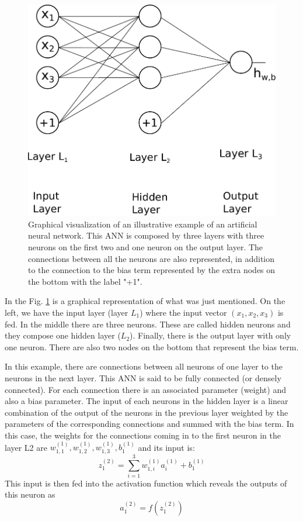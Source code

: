 \documentclass{article}
\begin{document}
\begin{figure}[!h]
	\centering
	\includegraphics[width=\linewidth]{firstANN.pdf}
	\caption{Graphical visualization of an illustrative example of an artificial neural network. This ANN is composed by three layers with three neurons on the first two and one neuron on the output layer. The connections between all the neurons are also represented, in addition to the connection to the bias term represented by the extra nodes on the bottom with the label "+1".
}
\label{fig:first-ANN}
\end{figure}
In the Fig. \ref{fig:first-ANN} is a graphical representation of what was just mentioned. On the left, we have the input layer (layer $L_1$) where the input vector $(x_1,x_2,x_3)$ is fed. In the middle there are three neurons. These are called hidden neurons and they compose one hidden layer ($L_2$). Finally, there is the output layer with only one neuron. There are also two nodes on the bottom that represent the bias term.

In this example, there are connections between all neurons of one layer to the neurons in the next layer. This ANN is said to be fully connected (or densely connected). For each connection there is an associated parameter (weight) and also a bias parameter. The input of each neurons in the hidden layer is a linear combination of the output of the neurons in the previous layer weighted by the parameters of the corresponding connections and summed with the bias term. In this case, the weights for the connections coming in to the first neuron in the layer L2 are $w_{1,1}^{(1)},w_{1,2}^{(1)},w_{1,3}^{(1)}, b_1^{( 1 )}$ and its input is:
\begin{equation}
z_1^{(2)} = \sum_{i=1}^3 w_{1,i}^{(1)} a_i^{(1)} + b_1^{(1)}
\end{equation}
This input is then fed into the activation function which reveals the outputs of this neuron as 
\begin{equation}
a_1^{( 2 )} = f\left( z_1^{(2)} \right)
\end{equation}
\end{document}
